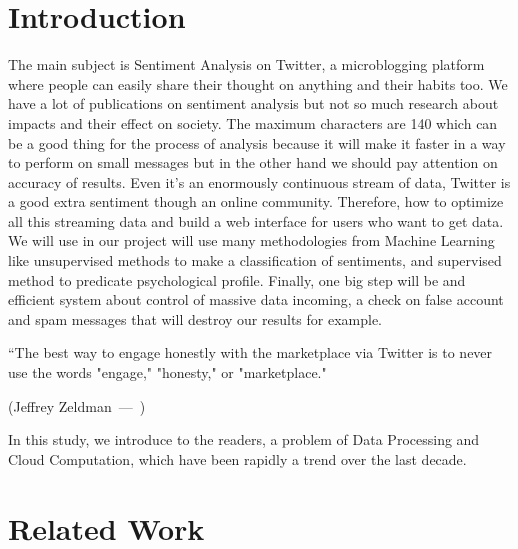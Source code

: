 \documentclass{acmtog} %
\let\oldquote\quote
\let\endoldquote\endquote
\renewenvironment{quote}[2][]
  {\if\relax\detokenize{#1}\relax
     \def\quoteauthor{#2}%
   \else
     \def\quoteauthor{#2~---~#1}%
   \fi
   \oldquote}
  {\par\nobreak\smallskip\hfill(\quoteauthor)%
   \endoldquote\addvspace{\bigskipamount}}
\begin{document}
\section{Introduction}

The main subject is Sentiment Analysis on Twitter, a microblogging platform where people can easily share their thought on anything and their habits too. We have a lot of publications on sentiment analysis but not so much research about impacts and their effect on society. The maximum characters are 140 which can be a good thing for the process of analysis because it will make it faster in a way to perform on small messages but in the other hand we should pay attention on accuracy of results. Even it’s an enormously continuous stream of data, Twitter is a good extra sentiment though an online community. Therefore, how to optimize all this streaming data and build a web interface for users who want to get data. We will use in our project will use many methodologies from Machine Learning like unsupervised methods to make a classification of sentiments, and supervised method to predicate psychological profile. Finally, one big step will be and efficient system about control of massive data incoming, a check on false account and spam messages that will destroy our results for example.
 
\begin{quote}{Jeffrey Zeldman}
“The best way to engage honestly with the marketplace via Twitter is to never use the words "engage," "honesty," or "marketplace." 
\end{quote}

In this study, we introduce to the readers, a problem of Data Processing and Cloud Computation, which have been rapidly a trend over the last decade. 

\section{Related Work}
\label{sec:related_work}
\end{document}
